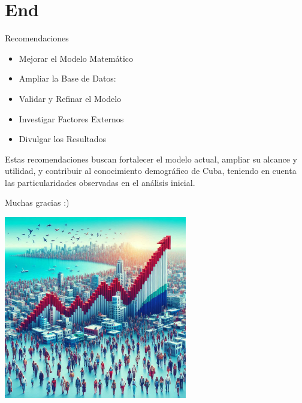 \documentclass{beamer}
\begin{document}
\section{End}
\begin{frame}{Recomendaciones}
\begin{itemize}
    \item Mejorar el Modelo Matemático
    \item Ampliar la Base de Datos:
    \item Validar y Refinar el Modelo
    \item Investigar Factores Externos
    \item Divulgar los Resultados
    \end{itemize}
    Estas recomendaciones buscan fortalecer el modelo actual, ampliar su alcance y utilidad, y contribuir al conocimiento demográfico de Cuba, teniendo en cuenta las particularidades observadas en el análisis inicial.
\end{frame}

\begin{frame}{Muchas gracias :)}
    \begin{center}
    \includegraphics[height = 8cm]{img/cuba1.jpeg}
    \end{center}
\end{frame}
\end{document}

